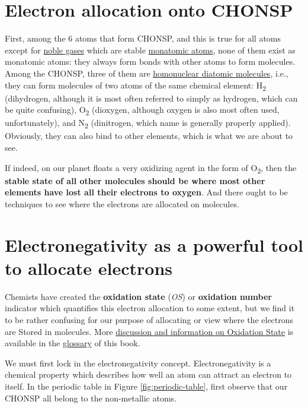 \documentclass[]{book}
\theoremstyle{definition}
\theoremstyle{definition}
\theoremstyle{definition}
\theoremstyle{remark}
\begin{document}
\section{Electron allocation onto
CHONSP}\label{electron-allocation-onto-chonsp}

First, among the 6 atoms that form CHONSP, and this is true for all
atoms except for \href{https://en.wikipedia.org/wiki/Noble_gas}{noble
gases} which are stable
\href{https://en.wikipedia.org/wiki/Monatomic_gas}{monatomic atoms},
none of them exist as monatomic atoms: they always form bonds with other
atoms to form molecules. Among the CHONSP, three of them are
\href{https://en.wikipedia.org/wiki/Diatomic_molecule}{homonuclear
diatomic molecules}, i.e., they can form molecules of two atoms of the
same chemical element: H\textsubscript{2} (dihydrogen, although it is
most often referred to simply as hydrogen, which can be quite
confusing), O\textsubscript{2} (dioxygen, although oxygen is also most
often used, unfortunately), and N\textsubscript{2} (dinitrogen, which
name is generally properly applied). Obviously, they can also bind to
other elements, which is what we are about to see.

If indeed, on our planet floats a very oxidizing agent in the form of
O\textsubscript{2}, then the \textbf{stable state of all other molecules
should be where most other elements have lost all their electrons to
oxygen}. And there ought to be techniques to see where the electrons are
allocated on molecules.

\section{Electronegativity as a powerful tool to allocate
electrons}\label{electronegativity-as-a-powerful-tool-to-allocate-electrons}

Chemists have created the \textbf{oxidation state} (\emph{OS}) or
\textbf{oxidation number} indicator which quantifies this electron
allocation to some extent, but we find it to be rather confusing for our
purpose of allocating or view where the electrons are Stored in
molecules. More \protect\hyperlink{oxidation-state}{discussion and
information on Oxidation State} is available in the
\protect\hyperlink{glossary}{glossary} of this book.

We must first lock in the electronegativity concept. Electronegativity
is a chemical property which describes how well an atom can attract an
electron to itself. In the periodic table in Figure
\ref{fig:periodic-table}, first observe that our CHONSP all belong to
the non-metallic atoms.
\end{document}

